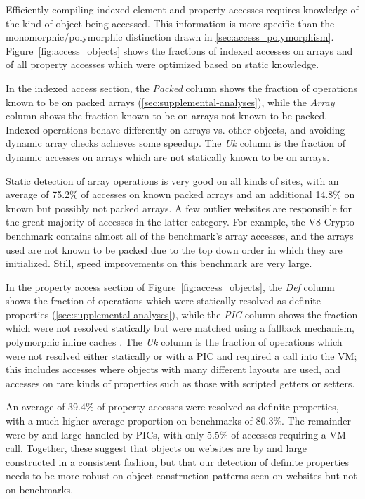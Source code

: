 Efficiently compiling indexed element and property accesses requires
knowledge of the kind of object being accessed.
This information is more specific than the monomorphic/polymorphic
distinction drawn in \Section\ref{sec:access_polymorphism}.
Figure~\ref{fig:access_objects} shows the fractions of indexed accesses on arrays
and of all property accesses which were optimized based on static knowledge.

In the indexed access section, the {\it Packed} column shows the fraction
of operations known to be on packed arrays (\Section\ref{sec:supplemental-analyses}),
while the {\it Array} column shows the fraction known to be on arrays not
known to be packed.
Indexed operations behave differently on arrays vs. other objects,
and avoiding dynamic array checks achieves some speedup.
The {\it Uk} column is the fraction of dynamic accesses on arrays which
are not statically known to be on arrays.

Static detection of array operations is very good on all kinds of sites,
with an average of 75.2\% of accesses on known packed arrays and
an additional 14.8\% on known but possibly not packed arrays.
A few outlier websites are responsible for the great majority of
accesses in the latter category.
For example, the V8 Crypto benchmark contains almost all of the benchmark's
array accesses, and the arrays used are not known to be packed
due to the top down order in which they are initialized.
Still, speed improvements on this benchmark are very large.

In the property access section of Figure~\ref{fig:access_objects},
the {\it Def} column shows the fraction
of operations which were statically resolved as definite properties
(\Section\ref{sec:supplemental-analyses}), while the {\it PIC} column shows the fraction which
were not resolved statically but were matched using a fallback mechanism,
polymorphic inline caches \cite{Holzle91}.
The {\it Uk} column is the fraction of operations which were not resolved
either statically or with a PIC and required a call into the VM;
this includes accesses where objects
with many different layouts are used, and accesses on rare kinds of
properties such as those with scripted getters or setters.

An average of 39.4\% of property accesses were resolved as definite properties,
with a much higher average proportion on benchmarks of 80.3\%.
The remainder were by and large handled by PICs, with only 5.5\% of
accesses requiring a VM call.
Together, these suggest that objects on websites are by and large
constructed in a consistent fashion, but that
our detection of definite properties needs
to be more robust on object construction patterns seen on websites but
not on benchmarks.


